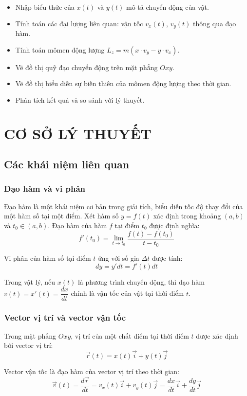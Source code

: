 \documentclass{report}
\begin{document}
\begin{itemize}
    \item Nhập biểu thức của $x(t)$ và $y(t)$ mô tả chuyển động của vật.
    \item Tính toán các đại lượng liên quan: vận tốc $v_x(t)$, $v_y(t)$ thông qua đạo hàm.
    \item Tính toán mômen động lượng $L_z = m(x \cdot v_y - y \cdot v_x)$.
    \item Vẽ đồ thị quỹ đạo chuyển động trên mặt phẳng $Oxy$.
    \item Vẽ đồ thị biểu diễn sự biến thiên của mômen động lượng theo thời gian.
    \item Phân tích kết quả và so sánh với lý thuyết.
\end{itemize}

\chapter{CƠ SỞ LÝ THUYẾT}

\section{Các khái niệm liên quan}

\subsection{Đạo hàm và vi phân}
Đạo hàm là một khái niệm cơ bản trong giải tích, biểu diễn tốc độ thay đổi của một hàm số tại một điểm. Xét hàm số $y = f(t)$ xác định trong khoảng $(a,b)$ và $t_0 \in (a,b)$. Đạo hàm của hàm $f$ tại điểm $t_0$ được định nghĩa:
\[f'(t_0) = \lim_{t \to t_0}\frac{f(t)-f(t_0)}{t-t_0}\]

Vi phân của hàm số tại điểm $t$ ứng với số gia $\Delta t$ được tính:
\[dy = y'dt = f'(t)dt\]

Trong vật lý, nếu $x(t)$ là phương trình chuyển động, thì đạo hàm $v(t) = x'(t) = \dfrac{dx}{dt}$ chính là vận tốc của vật tại thời điểm $t$.

\subsection{Vector vị trí và vector vận tốc}
Trong mặt phẳng $Oxy$, vị trí của một chất điểm tại thời điểm $t$ được xác định bởi vector vị trí:
\[\vec{r}(t) = x(t)\vec{i} + y(t)\vec{j}\]

Vector vận tốc là đạo hàm của vector vị trí theo thời gian:
\[\vec{v}(t) = \frac{d\vec{r}}{dt} = v_x(t)\vec{i} + v_y(t)\vec{j} = \frac{dx}{dt}\vec{i} + \frac{dy}{dt}\vec{j}\]
\end{document}
